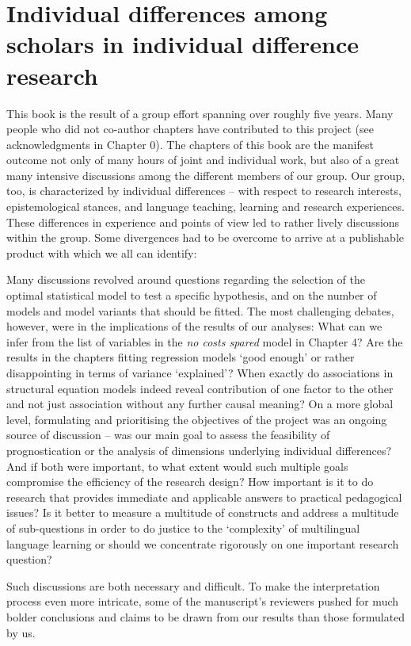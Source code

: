 \documentclass[output=paper]{langsci/langscibook}
\begin{document}
\section{Individual differences among scholars in individual difference research}

This book is the result of a group effort spanning over roughly five years. Many people who did not co-author chapters have contributed to this project (see acknowledgments in Chapter 0). The chapters of this book are the manifest outcome not only of many hours of joint and individual work, but also of a great many intensive discussions among the different members of our group. Our group, too, is characterized by individual differences – with respect to research interests, epistemological stances, and language teaching, learning and research experiences. These differences in experience and points of view led to rather lively discussions within the group. Some divergences had to be overcome to arrive at a publishable product with which we all can identify:

Many discussions revolved around questions regarding the selection of the optimal statistical model to test a specific hypothesis, and on the number of models and model variants that should be fitted. The most challenging debates, however, were in the implications of the results of our analyses: What can we infer from the list of variables in the \textit{no costs spared} model in Chapter 4? Are the results in the chapters fitting regression models ‘good enough’ or rather disappointing in terms of variance ‘explained’? When exactly do associations in structural equation models indeed reveal contribution of one factor to the other and not just association without any further causal meaning? On a more global level, formulating and prioritising the objectives of the project was an ongoing source of discussion – was our main goal to assess the feasibility of prognostication or the analysis of dimensions underlying individual differences? And if both were important, to what extent would such multiple goals compromise the efficiency of the research design? How important is it to do research that provides immediate and applicable answers to practical pedagogical issues? Is it better to measure a multitude of constructs and address a multitude of sub-questions in order to do justice to the ‘complexity’ of multilingual language learning or should we concentrate rigorously on one important research question? 

Such discussions are both necessary and difficult. To make the interpretation process even more intricate, some of the manuscript’s reviewers pushed for much bolder conclusions and claims to be drawn from our results than those formulated by us.
\end{document}
